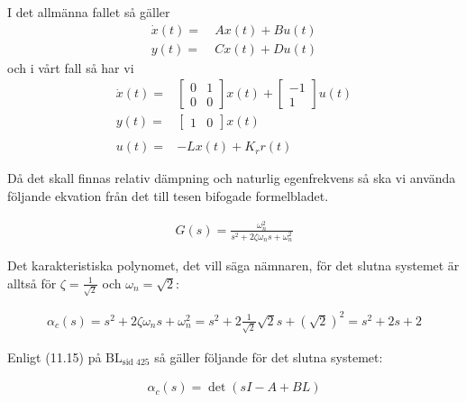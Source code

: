 \documentclass[a4paper]{article}
\newcommand{\bl}[1]{$\text{BL}_{\text{#1}}$}  %
\begin{document}
I det allmänna fallet så gäller
\begin{align*}
  \dot{x}(t) =~& Ax(t) + Bu(t) \\
  y(t) =~& Cx(t) + Du(t)
\end{align*}
och i vårt fall så har vi
\begin{align*}
  \dot{x}(t) =& \begin{bmatrix}0 & 1 \\ 0 & 0\end{bmatrix} x(t) + \begin{bmatrix}-1 \\ 1\end{bmatrix} u(t) \\
  y(t) =& \begin{bmatrix}1 & 0\end{bmatrix} x(t)\\\\
  u(t) =& -Lx(t) + K_r r(t)
\end{align*}


Då det skall finnas relativ dämpning och naturlig egenfrekvens så ska vi använda följande ekvation från det till tesen bifogade formelbladet.

\begin{align*}
  G(s) = \frac{\omega_n ^2}{s^2 + 2\zeta \omega_n s + \omega_n^2}
\end{align*}

Det karakteristiska polynomet, det vill säga nämnaren, för det slutna systemet är alltså för $\zeta = \frac{1}{\sqrt{2}}$ och $\omega_n = \sqrt{2}$:

\begin{align*}
  \alpha_c(s) = s^2 + 2\zeta \omega_n s + \omega_n^2 = s^2 + 2\frac{1}{\sqrt{2}} \sqrt{2} s + (\sqrt{2})^2 = s^2 + 2s + 2
\end{align*}

Enligt (11.15) på \bl{sid 425} så gäller följande för det slutna systemet:

\begin{align*}
  \alpha_c(s) = \det(sI - A + BL)
\end{align*}
\end{document}
